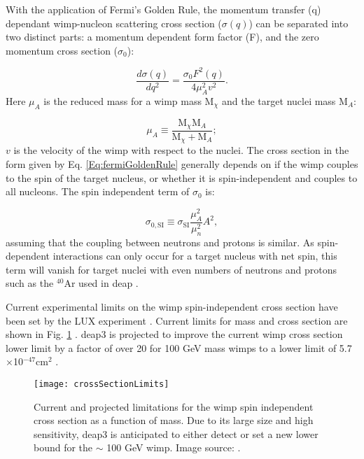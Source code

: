 With the application of Fermi's Golden Rule, the momentum transfer (q) dependant \gls{wimp}-nucleon scattering cross section ($\sigma(q)$) can be separated into two distinct parts: a momentum dependent form factor (F), and the zero momentum cross section ($\sigma_0$): 

\begin{equation}
\frac{d \sigma (q)}{d q^2} = \frac{\sigma_0 F^2 (q)}{4 \mu_A^2 v^2}.
\label{Eq:fermiGoldenRule}
\end{equation}
 Here $\mu_A$ is the reduced mass for a \gls{wimp} mass M$_\chi$ and the target nuclei mass M$_A$:
 
 
 \begin{equation}
 \mu_A \equiv \frac{\text{M}_{\chi} \text{M}_A}{\text{M}_{\chi} + \text{M}_A};
 \label{Eq:reducedMass}
 \end{equation}
 $v$ is the velocity of the \gls{wimp} with respect to the nuclei. 
 The cross section in the form given by Eq. \eqref{Eq:fermiGoldenRule} generally depends on if the \gls{wimp} couples to the spin of the target nucleus, or whether it is spin-independent and couples to all nucleons. The spin independent term of $\sigma_0$ is:
 
 \begin{equation}
 \sigma_{0,\text{SI}} \equiv \sigma_{\text{SI}} \frac{\mu_A ^2}{\mu_n^2}A^2,
 \label{Eq:spinIndepSigma}
 \end{equation}
 assuming that the coupling between neutrons and protons is similar. As spin-dependent interactions can only occur for a target nucleus with net spin, this term will vanish for target nuclei with even numbers of neutrons and protons such as the $^{40}$Ar used in \gls{deap} \cite{introToDMExperiments}.
 
 
 Current experimental limits on the \gls{wimp} spin-independent cross section have been set by the LUX experiment \cite{LUX2015Results}. Current limits for mass and cross section are shown in Fig. \ref{Fig:wimpLimits} \cite{deap3DarkMatterSearch}. \gls{deap3} is projected to improve the current \gls{wimp} cross section lower limit by a factor of over 20 for 100 GeV mass \gls{wimp}s to a lower limit of 5.7$\times$10$^{-47}$cm$^{2}$ \cite{deap3DarkMatterSearch} \cite{alaisterThesis}.
 
 \begin{figure}
 \centering
 \texttt{[image: crossSectionLimits]}
 \caption{Current and projected limitations for the \gls{wimp} spin independent cross section as a function of mass. Due to its large size and high sensitivity, \gls{deap3} is anticipated to either detect or set a new lower bound for the $\sim$ 100 GeV \gls{wimp}. Image source: \cite{deap3DarkMatterSearch}. }
 \label{Fig:wimpLimits}
 \end{figure}